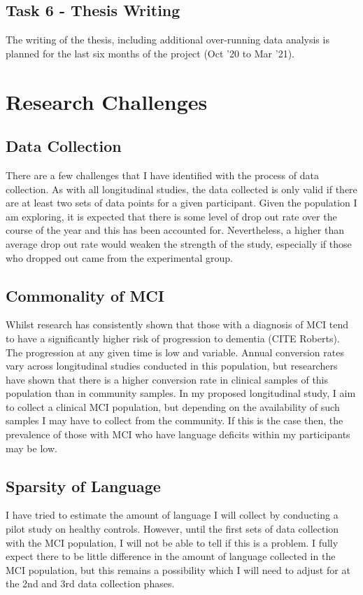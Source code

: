 \documentclass[10pt, letterpaper, twoside, openany]{book}
\begin{document}
\subsection{Task 6 - Thesis Writing}
The writing of the thesis, including additional over-running data analysis is planned for the last six months of the project (Oct '20 to Mar '21).

\section{Research Challenges}
\subsection{Data Collection}
There are a few challenges that I have identified with the process of data collection. As with all longitudinal studies, the data collected is only valid if there are at least two sets of data points for a given participant. Given the population I am exploring, it is expected that there is some level of drop out rate over the course of the year and this has been accounted for.  Nevertheless, a higher than average drop out rate would weaken the strength of the study, especially if those who dropped out came from the experimental group.

\subsection{Commonality of MCI}
Whilst research has consistently shown that those with a diagnosis of MCI tend to have a significantly higher risk of progression to dementia (CITE Roberts). The progression at any given time is low and variable.
Annual conversion rates vary across longitudinal studies conducted in this population, but researchers have shown that there is a higher conversion rate in clinical samples of this population than in community samples. In my proposed longitudinal study, I aim to collect a clinical MCI population, but depending on the availability of such samples I may have to collect from the community. If this is the case then, the prevalence of those with MCI who have language deficits within my participants may be low.

\subsection{Sparsity of Language}
I have tried to estimate the amount of language I will collect by conducting a pilot study on healthy controls. However, until the first sets of data collection with the MCI population, I will not be able to tell if this is a problem. I fully expect there to be little difference in the amount of language collected in the MCI population, but this remains a possibility which I will need to adjust for at the 2nd and 3rd data collection phases. 
\end{document}
